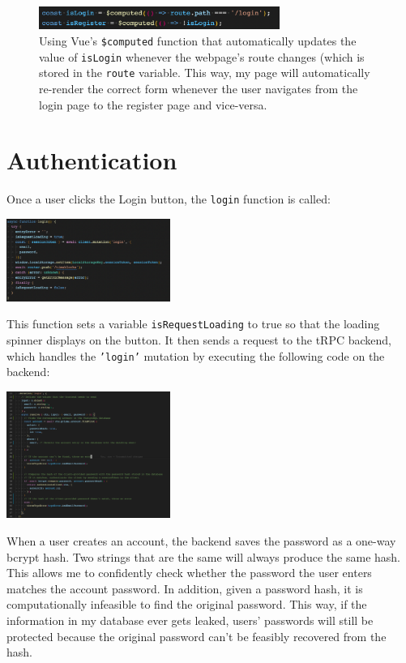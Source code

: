 \documentclass[notitlepage, 12pt]{report}
\newcommand{\code}[1]{\texttt{#1}}
\begin{document}
\begin{figure}[H]
	\centering
	\caption{Using Vue's \code{\$computed} function that automatically updates the value of \code{isLogin} whenever the webpage's route changes (which is stored in the \code{route} variable. This way, my page will automatically re-render the correct form whenever the user navigates from the login page to the register page and vice-versa.}
	\includegraphics[width=0.7\textwidth]{frontend-entry-page-route.png}
\end{figure}

\newpage

\section*{Authentication}

Once a user clicks the Login button, the \code{login} function is called:

\includegraphics[width=0.4\textwidth]{frontend-login-function.png}

This function sets a variable \code{isRequestLoading} to true so that the loading spinner displays on the button. It then sends a request to the tRPC backend, which handles the \code{'login'} mutation by executing the following code on the backend:

\includegraphics[width=0.4\textwidth]{backend-login-function.png}

When a user creates an account, the backend saves the password as a one-way bcrypt hash. Two strings that are the same will always produce the same hash. This allows me to confidently check whether the password the user enters matches the account password. In addition, given a password hash, it is computationally infeasible to find the original password. This way, if the information in my database ever gets leaked, users' passwords will still be protected because the original password can't be feasibly recovered from the hash.
\end{document}
